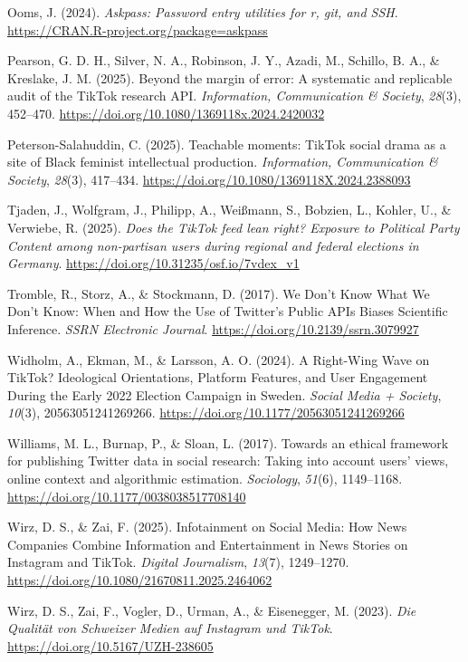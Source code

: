 \documentclass[
  nobib]{ccr}
\newlength{\cslhangindent}
\newenvironment{CSLReferences}[2] %
 {\begin{list}{}{%
  \setlength{\itemindent}{0pt}
  \setlength{\leftmargin}{0pt}
  \setlength{\parsep}{0pt}
  \ifodd #1
   \setlength{\leftmargin}{\cslhangindent}
   \setlength{\itemindent}{-1\cslhangindent}
  \fi
  \setlength{\itemsep}{#2\baselineskip}}}
 {\end{list}}
\begin{document}
\begin{CSLReferences}{1}{0}
Ooms, J. (2024). \emph{Askpass: Password entry utilities for r, git, and
SSH}. \url{https://CRAN.R-project.org/package=askpass}

Pearson, G. D. H., Silver, N. A., Robinson, J. Y., Azadi, M., Schillo,
B. A., \& Kreslake, J. M. (2025). Beyond the margin of error: A
systematic and replicable audit of the {TikTok} research {API}.
\emph{Information, Communication \& Society}, \emph{28}(3), 452--470.
\url{https://doi.org/10.1080/1369118x.2024.2420032}

Peterson-Salahuddin, C. (2025). Teachable moments: {TikTok} social drama
as a site of {Black} feminist intellectual production.
\emph{Information, Communication \& Society}, \emph{28}(3), 417--434.
\url{https://doi.org/10.1080/1369118X.2024.2388093}

Tjaden, J., Wolfgram, J., Philipp, A., Weißmann, S., Bobzien, L.,
Kohler, U., \& Verwiebe, R. (2025). \emph{Does the {TikTok} feed lean
right? {Exposure} to {Political} {Party} {Content} among non-partisan
users during regional and federal elections in {Germany}}.
\url{https://doi.org/10.31235/osf.io/7vdex_v1}

Tromble, R., Storz, A., \& Stockmann, D. (2017). We {Don}'t {Know}
{What} {We} {Don}'t {Know}: {When} and {How} the {Use} of {Twitter}'s
{Public} {APIs} {Biases} {Scientific} {Inference}. \emph{SSRN Electronic
Journal}. \url{https://doi.org/10.2139/ssrn.3079927}

Widholm, A., Ekman, M., \& Larsson, A. O. (2024). A {Right}-{Wing}
{Wave} on {TikTok}? {Ideological} {Orientations}, {Platform} {Features},
and {User} {Engagement} {During} the {Early} 2022 {Election} {Campaign}
in {Sweden}. \emph{Social Media + Society}, \emph{10}(3),
20563051241269266. \url{https://doi.org/10.1177/20563051241269266}

Williams, M. L., Burnap, P., \& Sloan, L. (2017). Towards an ethical
framework for publishing {Twitter} data in social research: {Taking}
into account users' views, online context and algorithmic estimation.
\emph{Sociology}, \emph{51}(6), 1149--1168.
\url{https://doi.org/10.1177/0038038517708140}

Wirz, D. S., \& Zai, F. (2025). Infotainment on {Social} {Media}: {How}
{News} {Companies} {Combine} {Information} and {Entertainment} in {News}
{Stories} on {Instagram} and {TikTok}. \emph{Digital Journalism},
\emph{13}(7), 1249--1270.
\url{https://doi.org/10.1080/21670811.2025.2464062}

Wirz, D. S., Zai, F., Vogler, D., Urman, A., \& Eisenegger, M. (2023).
\emph{Die {Qualität} von {Schweizer} {Medien} auf {Instagram} und
{TikTok}}. \url{https://doi.org/10.5167/UZH-238605}

\end{CSLReferences}
\end{document}
